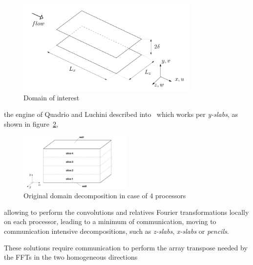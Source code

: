 \begin{figure}
\centering
\includegraphics[width=0.8\textwidth]{grafici/sketch_dominio}
\caption{Domain of interest}
\label{sketch_dominio}
\end{figure}


the engine of Quadrio and Luchini described into~\cite{cpl:presentazione} which works per \emph{y-slabs}, as shown in figure~\ref{domain_decomp},
\begin{figure}
\centering
\includegraphics[width=0.5\textwidth]{grafici/decomp_dominio_cpl}
\caption{Original domain decomposition in case of 4 processors}
\label{domain_decomp}
\end{figure} allowing to perform the convolutions and relatives Fourier transformations locally on each processor, leading to a minimum of communication, moving to communication intensive decompositions, such as \emph{z-slabs}, \emph{x-slabs} or \emph{pencils}.

These solutions require communication to perform the array transpose needed by the FFTs in the two homogeneous directions
